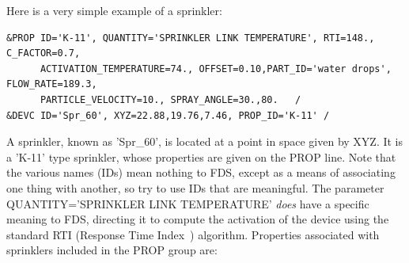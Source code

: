 \documentclass[11pt]{book}
\begin{document}
Here is a very simple example of a sprinkler:
\begin{lstlisting}
&PROP ID='K-11', QUANTITY='SPRINKLER LINK TEMPERATURE', RTI=148., C_FACTOR=0.7,
      ACTIVATION_TEMPERATURE=74., OFFSET=0.10,PART_ID='water drops', FLOW_RATE=189.3,
      PARTICLE_VELOCITY=10., SPRAY_ANGLE=30.,80.   /
&DEVC ID='Spr_60', XYZ=22.88,19.76,7.46, PROP_ID='K-11' /
\end{lstlisting}
A sprinkler, known as {\ct 'Spr\_60'}, is located at a point in space given by {\ct XYZ}. It is a {\ct 'K-11'} type sprinkler, whose properties are given on the {\ct PROP} line. Note that the various names ({\ct ID}s) mean nothing to FDS, except as a means of associating one thing with another, so try to use {\ct ID}s that are meaningful.  The parameter {\ct QUANTITY='SPRINKLER LINK TEMPERATURE'} {\em does} have a specific meaning to FDS, directing it to compute the activation of the device using the standard RTI (Response Time Index~\cite{Heskestad:3}) algorithm. Properties associated with sprinklers included in the {\ct PROP} group are:
\end{document}

